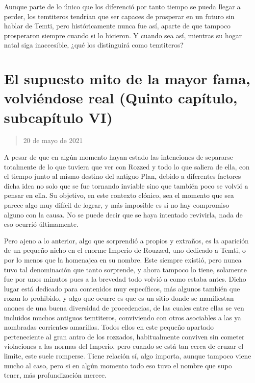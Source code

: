 \documentclass[
  spanish,
]{book}
\begin{document}
Aunque parte de lo único que los diferenció por tanto tiempo se pueda llegar a perder, los temtiteros tendrían que ser capaces de prosperar en un futuro sin hablar de Temti, pero históricamente nunca fue así, aparte de que tampoco prosperaron siempre cuando si lo hicieron.
Y cuando sea así, mientras su hogar natal siga inaccesible, ¿qué los distinguirá como temtiteros?

\hypertarget{el-supuesto-mito-de-la-mayor-fama-volviuxe9ndose-real-quinto-capuxedtulo-subcapuxedtulo-vi}{%
\section{El supuesto mito de la mayor fama, volviéndose real (Quinto capítulo, subcapítulo VI)}\label{el-supuesto-mito-de-la-mayor-fama-volviuxe9ndose-real-quinto-capuxedtulo-subcapuxedtulo-vi}}

\begin{quote}
20 de mayo de 2021
\end{quote}

A pesar de que en algún momento hayan estado las intenciones de separarse totalmente de lo que tuviera que ver con Rozzed y todo lo que saliera de ella, con el tiempo junto al mismo destino del antiguo Plan, debido a diferentes factores dicha idea no solo que se fue tornando inviable sino que también poco se volvió a pensar en ella. Su objetivo, en este contexto clónico, sea el momento que sea parece algo muy difícil de lograr, y más imposible es si no hay compromiso alguno con la causa. No se puede decir que se haya intentado revivirla, nada de eso ocurrió últimamente.

Pero ajeno a lo anterior, algo que sorprendió a propios y extraños, es la aparición de un pequeño nicho en el enorme Imperio de Rouzzed, uno dedicado a Temti, o por lo menos que la homenajea en su nombre. Este siempre existió, pero nunca tuvo tal denominación que tanto sorprende, y ahora tampoco lo tiene, solamente fue por unos minutos pues a la brevedad todo volvió a como estaba antes. Dicho lugar está dedicado para contenidos muy específicos, más algunos también que rozan lo prohibido, y algo que ocurre es que es un sitio donde se manifiestan anones de una buena diversidad de procedencias, de las cuales entre ellas se ven incluidos muchos antiguos temtiteros, conviviendo con otros asociables a las ya nombradas corrientes amarillas. Todos ellos en este pequeño apartado perteneciente al gran antro de los rozzados, habitualmente conviven sin cometer violaciones a las normas del Imperio, pero cuando se está tan cerca de cruzar el limite, este suele romperse. Tiene relación sí, algo importa, aunque tampoco viene mucho al caso, pero si en algún momento todo eso tuvo el nombre que supo tener, más profundización merece.
\end{document}
